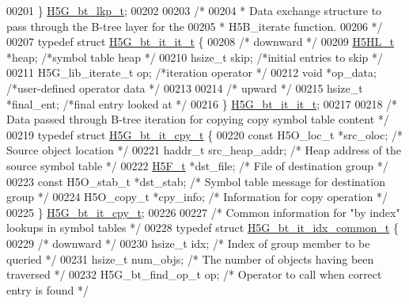 \begin{DoxyCode}
00201 \} \hyperlink{struct_h5_g__bt__lkp__t}{H5G\_bt\_lkp\_t};
00202 
00203 \textcolor{comment}{/*}
00204 \textcolor{comment}{ * Data exchange structure to pass through the B-tree layer for the}
00205 \textcolor{comment}{ * H5B\_iterate function.}
00206 \textcolor{comment}{ */}
00207 \textcolor{keyword}{typedef} \textcolor{keyword}{struct }\hyperlink{struct_h5_g__bt__it__it__t}{H5G\_bt\_it\_it\_t} \{
00208     \textcolor{comment}{/* downward */}
00209     \hyperlink{struct_h5_h_l__t}{H5HL\_t}      *heap;          \textcolor{comment}{/*symbol table heap                */}
00210     hsize\_t skip;       \textcolor{comment}{/*initial entries to skip            */}
00211     H5G\_lib\_iterate\_t op;   \textcolor{comment}{/*iteration operator                 */}
00212     \textcolor{keywordtype}{void}    *op\_data;   \textcolor{comment}{/*user-defined operator data             */}
00213 
00214     \textcolor{comment}{/* upward */}
00215     hsize\_t *final\_ent; \textcolor{comment}{/*final entry looked at                      */}
00216 \} \hyperlink{struct_h5_g__bt__it__it__t}{H5G\_bt\_it\_it\_t};
00217 
00218 \textcolor{comment}{/* Data passed through B-tree iteration for copying copy symbol table content */}
00219 \textcolor{keyword}{typedef} \textcolor{keyword}{struct }\hyperlink{struct_h5_g__bt__it__cpy__t}{H5G\_bt\_it\_cpy\_t} \{
00220     \textcolor{keyword}{const} H5O\_loc\_t *src\_oloc;  \textcolor{comment}{/* Source object location */}
00221     haddr\_t     src\_heap\_addr;  \textcolor{comment}{/* Heap address of the source symbol table  */}
00222     \hyperlink{struct_h5_f__t}{H5F\_t}       *dst\_file;      \textcolor{comment}{/* File of destination group */}
00223     \textcolor{keyword}{const} H5O\_stab\_t *dst\_stab; \textcolor{comment}{/* Symbol table message for destination group */}
00224     H5O\_copy\_t  *cpy\_info;      \textcolor{comment}{/* Information for copy operation */}
00225 \} \hyperlink{struct_h5_g__bt__it__cpy__t}{H5G\_bt\_it\_cpy\_t};
00226 
00227 \textcolor{comment}{/* Common information for "by index" lookups in symbol tables */}
00228 \textcolor{keyword}{typedef} \textcolor{keyword}{struct }\hyperlink{struct_h5_g__bt__it__idx__common__t}{H5G\_bt\_it\_idx\_common\_t} \{
00229     \textcolor{comment}{/* downward */}
00230     hsize\_t     idx;            \textcolor{comment}{/* Index of group member to be queried */}
00231     hsize\_t     num\_objs;       \textcolor{comment}{/* The number of objects having been traversed */}
00232     H5G\_bt\_find\_op\_t op;        \textcolor{comment}{/* Operator to call when correct entry is found */}

\end{DoxyCode}
